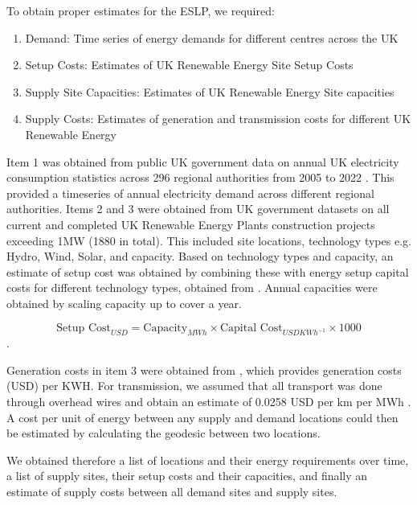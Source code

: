 
To obtain proper estimates for the ESLP, we required:

\begin{enumerate}
    \item Demand: Time series of energy demands for different centres across the UK
    \item Setup Costs: Estimates of UK Renewable Energy Site Setup Costs
    \item Supply Site Capacities: Estimates of UK Renewable Energy Site capacities
    \item Supply Costs: Estimates of generation and transmission costs for different UK Renewable Energy 
\end{enumerate}

Item 1 was obtained from public UK government data on annual UK
electricity consumption statistics across 296 regional authorities from 2005 to 2022 \cite{sub_national_electricity_consumption}.
This provided a timeseries of annual electricity demand across different regional authorities.
Items 2 and 3 were obtained from UK government datasets on all current and completed UK Renewable 
Energy Plants construction projects exceeding 1MW (1880 in total). This included site locations,
technology types e.g. Hydro, Wind, Solar, and capacity.
Based on technology types and capacity, an estimate of setup cost was obtained by combining these
with energy setup capital costs for different technology types, obtained from \cite{nalley2022annual}. Annual capacities 
were obtained by scaling capacity up to cover a year.

\begin{equation}
    \text{Setup Cost}_{USD} = \text{Capacity}_{MWh} \times \text{Capital Cost}_{USD KWh^{-1}} \times 1000 
\end{equation}.

Generation costs in item 3 were obtained from \cite{irena2020}, which provides generation costs (USD) per KWH. 
For transmission, we assumed that all transport was done through overhead wires and obtain an estimate
of 0.0258 USD per km per MWh \cite{desantis2021cost}. A cost per unit of energy between any supply and 
demand locations could then be estimated by calculating the geodesic between two locations. \par

We obtained therefore a list of locations and their energy requirements over time, a list of supply sites,
their setup costs and their capacities, and finally an estimate of supply costs between all demand sites and 
supply sites.
